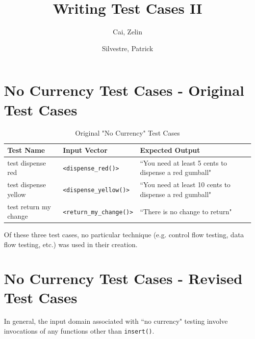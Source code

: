 \documentclass[10pt,letterpaper]{article}
\title{Writing Test Cases II}
\author{
	Cai, Zelin\\
	\and
	Silvestre, Patrick\\
}
\date{}
\begin{document}
\maketitle
\section{No Currency Test Cases - Original Test Cases}
\begin{table}[!htb]
\begin{tabularx}{\textwidth}{XXX}
\toprule
Test Name &
    Input Vector &
    Expected Output \\ \midrule
test dispense red &
    \texttt{<dispense\_red()>} &
    ``You need at least 5 cents to dispense a red gumball" \\ \midrule
test dispense yellow &
    \texttt{<dispense\_yellow()>} &
    ``You need at least 10 cents to dispense a red gumball" \\ \midrule
test return my change &
    \texttt{<return\_my\_change()>} &
    ``There is no change to return" \\ \bottomrule
\end{tabularx}
\caption{Original "No Currency" Test Cases}
\end{table}

Of these three test cases, no particular technique (e.g. control flow testing, data flow testing, etc.) was used in their creation.

\newpage
\section{No Currency Test Cases - Revised Test Cases}
In general, the input domain associated with ``no currency" testing involve invocations of any functions other than \texttt{insert()}.
\end{document}

